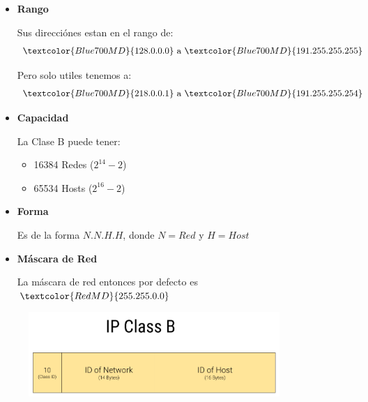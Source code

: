 \documentclass[12pt, fleqn]{report}                             %
\theoremstyle{break}                                            %
\newcommand{\Color}[2]{\textcolor{#1}{#2}}                      %
\begin{document}
                \begin{itemize}
                    \item 
                        \textbf{Rango}

                        Sus direcciónes estan en el rango de:
                        \begin{equation*}
                            \Color{Blue700MD}{128.0.0.0}
                            \text{ a }
                            \Color{Blue700MD}{191.255.255.255}
                        \end{equation*}

                        Pero solo utiles tenemos a:
                        \begin{equation*}
                            \Color{Blue700MD}{218.0.0.1}
                            \text{ a }
                            \Color{Blue700MD}{191.255.255.254}
                        \end{equation*}

                    \item
                        \textbf{Capacidad}

                            La Clase B puede tener:
                            \begin{itemize}
                                \item 16384 Redes ($2^{14} - 2$)
                                \item 65534 Hosts ($2^{16} - 2$)
                            \end{itemize}

                    \item
                        \textbf{Forma}

                            Es de la forma $N.N.H.H$, donde $N = Red$ y $H = Host$

                    \item
                        \textbf{Máscara de Red}

                            La máscara de red entonces por defecto es $\Color{RedMD}{255.255.0.0}$


                \end{itemize}


                \begin{figure}[h]
                    \centering
                    \includegraphics[width=0.85\textwidth]{ClassB}
                \end{figure}
\end{document}

